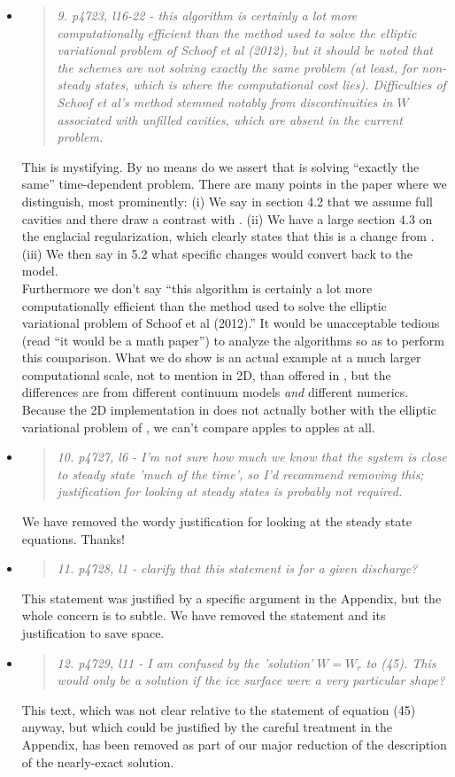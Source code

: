 \documentclass[11pt,reqno]{amsart}
\newcommand{\reply}[2]{
\medskip\medskip
\item  \begin{quote}
\emph{#1}
\end{quote}

\medskip
\noindent #2}
\begin{document}
\begin{itemize}
\reply{9. p4723, l16-22 - this algorithm is certainly a lot more computationally efficient than the method used to solve the elliptic variational problem of Schoof et al (2012), but it should be noted that the schemes are not solving exactly the same problem (at least, for non-steady states, which is where the computational cost lies).  Difficulties of Schoof et al's method stemmed notably from discontinuities in $W$ associated with unfilled cavities, which are absent in the current problem.}
{This is mystifying.  By no means do we assert that \cite{Schoofetal2012} is solving ``exactly the same'' time-dependent problem.  There are many points in the paper where we distinguish, most prominently: (i) We say in section 4.2 that we assume full cavities and there draw a contrast with \cite{Schoofetal2012}. (ii) We have a large section 4.3 on the englacial regularization, which clearly states that this is a change from \cite{Schoofetal2012}. (iii) We then say in 5.2 what specific changes would convert back to the \cite{Schoofetal2012} model.  \\
\indent Furthermore we don't say ``this algorithm is certainly a lot more computationally efficient than the method used to solve the elliptic variational problem of Schoof et al (2012).''  It would be unacceptable tedious (read ``it would be a math paper'') to analyze the algorithms so as to perform this comparison.  What we do show is an actual example at a much larger computational scale, not to mention in 2D, than offered in \cite{Schoofetal2012}, but the differences are from different continuum models \emph{and} different numerics.  Because the 2D implementation in \cite{Werderetal2013} does not actually bother with the elliptic variational problem of \cite{Schoofetal2012}, we can't compare apples to apples at all.}

\reply{10. p4727, l6 - I'm not sure how much we know that the system is close to steady state 'much of the time', so I'd recommend removing this; justification for looking at steady states is probably not required.}
{We have removed the wordy justification for looking at the steady state equations.  Thanks!}

\reply{11. p4728, l1 - clarify that this statement is for a given discharge?}
{This statement was justified by a specific argument in the Appendix, but the whole concern is to subtle.  We have removed the statement and its justification to save space.}

\reply{12. p4729, l11 - I am confused by the 'solution' $W = W_r$ to (45). This would only be a solution if the ice surface were a very particular shape?}
{This text, which was not clear relative to the statement of equation (45) anyway, but which could be justified by the careful treatment in the Appendix, has been removed as part of our major reduction of the description of the nearly-exact solution.}


\end{itemize}
\end{document}
